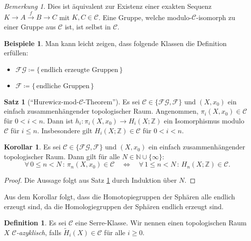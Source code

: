 \documentclass[11pt, a4paper, german]{article}
\theoremstyle{definition}
\newtheorem{satz}{Satz}
\newtheorem{defn}{Definition}
\newtheorem{bspe}{Beispiele}
\newtheorem{kor}{Korollar}
\theoremstyle{remark}
\newtheorem*{bem}{Bemerkung}
\newcommand{\N}{\mathbb{N}} %
\newcommand{\Z}{\mathbb{Z}} %
\newcommand{\fa}[1]{\forall \, {#1} \,:\,}
\newcommand{\SC}{\mathcal{C}} %
\newcommand{\FG}{\mathcal{FG}} %
\newcommand{\F}{\mathcal{F}} %
\begin{document}
\begin{bem}
  Dies ist äquivalent zur Existenz einer exakten Sequenz $K \to A \xrightarrow{f} B \to C$ mit $K, C \in \SC$.
  Eine Gruppe, welche modulo-$\SC$-isomorph zu einer Gruppe aus $\SC$ ist, ist selbst in $\SC$.
\end{bem}

\begin{bspe}
  Man kann leicht zeigen, dass folgende Klassen die Definition erfüllen:
  \begin{itemize}
    \item $\FG \coloneqq \{\, \text{endlich erzeugte Gruppen} \,\}$
    \item $\F \coloneqq \{\, \text{endliche Gruppen} \,\}$
  \end{itemize}
\end{bspe}


\begin{satz}["`Hurewicz-mod-$\SC$-Theorem"']\label{hurewicz-mod-c}
  Es sei $\SC \in \{ \FG, \F \}$ und
  $(X, x_0)$ ein einfach zusammenhängender topologischer Raum.
  Angenommen, $\pi_i(X, x_0) \in \SC$ für $0 < i < n$.
  Dann ist $h_i : \pi_i(X, x_0) \to H_i(X; \Z)$ ein Isomorphismus modulo $\SC$ für $i \leq n$.
  Insbesondere gilt $H_i(X; \Z) \in \SC$ für $0 < i < n$.
\end{satz}


\begin{kor}\label{homotopy-in-c-iff-homology-in-c}
  Es sei $\SC \in \{ \FG, \F \}$ und
  $(X, x_0)$ ein einfach zusammenhängender topologischer Raum.
  Dann gilt für alle $N \in \N \cup \{ \infty \}$:
  \[
    \fa{0 \leq n < N} \pi_n(X, x_0) \in \SC
    \quad \iff \quad
    \fa{1 \leq n < N} H_n(X; \Z) \in \SC.
  \]
\end{kor}

\begin{proof}
  Die Aussage folgt aus Satz \ref{hurewicz-mod-c} durch Induktion über $N$.
\end{proof}

Aus dem Korollar folgt, dass die Homotopiegruppen der Sphären alle endlich erzeugt sind, da die Homologiegruppen der Sphären endlich erzeugt sind.

\begin{defn}
  Es sei $\SC$ eine Serre-Klasse.
  Wir nennen einen topologischen Raum~$X$ \emph{$\SC$-azyklisch}, falls $\widetilde{H}_i(X) \in \SC$ für alle $i \geq 0$.
\end{defn}
\end{document}
